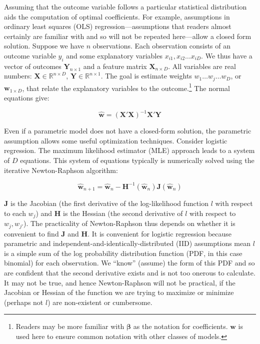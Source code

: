 \documentclass{article}
\begin{document}
Assuming that the outcome variable follows a
particular statistical distribution aids the computation of optimal coefficients. 
For example, assumptions in ordinary least squares (OLS)
regression---assumptions that readers almost certainly are familiar with and so will not be
repeated here---allow a closed form solution. Suppose we have $n$
observations. Each observation consists of an outcome variable $y_i$ and some
explanatory variables $x_{i1}, x_{i2}\ldots x_{iD}$. We thus have a vector of
outcomes $\bm{Y}_{n \times 1}$ and a feature matrix $\bm{X}_{n \times D}$. All
variables are real numbers: $\bm{X} \in \mathbb{R}^{n \times D}$, $\bm{Y} \in
\mathbb{R}^{n \times 1}$. The goal
is estimate weights $w_1 \ldots w_j \ldots w_D$, or $\bm{w}_{1 \times D}$, that relate the explanatory variables
to the outcome.\footnote{Readers may be more familiar with $\bm{\beta}$ as the
notation for coefficients. $\bm{w}$ is used here to ensure common notation with
other classes of models.} The normal equations give:

$$
\hat{\bm{w}} = (\bm{X}'\bm{X})^{-1}\bm{X}'\bm{Y}
$$

Even if a parametric model does not have a closed-form solution, the parametric
assumption allows some useful optimization techniques. Consider logistic
regression. The maximum likelihood estimator (MLE) approach leads to
a system of $D$ equations. This system of
equations typically is numerically solved using the iterative Newton-Raphson
algorithm:

$$
\hat{\bm{w}}_{n+1} = \hat{\bm{w}}_{n} -
\bm{H}^{-1}(\hat{\bm{w}}_n)\bm{J}(\hat{\bm{w}}_n)
$$

$\bm{J}$ is the Jacobian (the
first derivative of the log-likelihood function $l$ with respect to each $w_j$)
and $\bm{H}$ is the Hessian (the second derivative of $l$ with respect to $w_j,
w_{j'}$). The practicality of Newton-Raphson thus depends on whether it is convenient to
find $\bm{J}$ and $\bm{H}$. It is convenient for logistic regression
because parametric and independent-and-identically-distributed (IID) assumptions
mean $l$ is a simple sum of the log probability distribution
function (PDF, in this case binomial) for each observation. We ``know'' (assume)
the form of this PDF and so are
confident that the second derivative exists and is not too onerous to calculate. It may not be true, and hence
Newton-Raphson will not be practical, if the Jacobian or Hessian of the function we are trying to
maximize or minimize (perhaps not $l$) are non-existent or cumbersome. 
\end{document}
